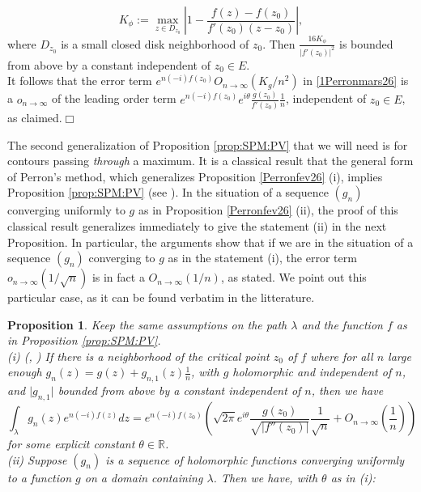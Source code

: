 \documentclass[11pt]{amsart}
\newtheorem{prop}[teo]{Proposition}
\newcommand{\mr}{\mathbb{R}}
\begin{document}
{$$K_\phi := \max_{z\in D_{z_0}} \left \vert 1-\frac{f(z)-f(z_0)}{f'(z_0)(z-z_0)}\right\vert,$$
where $D_{z_0}$ is a small closed disk neighborhood of $z_0$.  Then $\textstyle \frac{16K_\phi}{\vert f'(z_0)\vert^2}$ is bounded from above by a constant independent of $z_0\in E$.\\
It follows that the error term $\textstyle e^{n (-i) f(z_0)} O_{n \to \infty}\left(K_g/n^2\right)$ in \eqref{1Perronmars26} is a $\textstyle o_{n \to \infty}$ of the leading order term $\textstyle e^{n (-i) f(z_0)} e^{i \theta} \frac{g(z_0)}{f'(z_0)}\frac{1}{n}$, independent of $z_0\in E$, as claimed.\hfill $\Box$
\medskip

The second generalization of Proposition \ref{prop:SPM:PV} that we will need is for contours passing {\it through} a maximum. It is a classical result that the general form of Perron's method, which generalizes Proposition \ref{Perronfev26} (i), implies Proposition \ref{prop:SPM:PV} (see \cite[Corollary 1.4, case of $\mu=2$ and $k_2=k_1+1$]{O'Sul}). In the situation of a sequence $(g_n)$ converging uniformly to $g$ as in Proposition \ref{Perronfev26} (ii), the proof of this classical result generalizes immediately to give the statement (ii) in the next Proposition. In particular, the arguments show that if we are in the situation of a sequence $(g_n)$ converging to $g$ as in the statement (i), the error term $\textstyle o_{n \to \infty}\left(1/\sqrt{n}\right)$ is in fact a $O_{n \to \infty}\left(1/n\right)$, as stated. We point out this particular case, as it can be found verbatim in the litterature.
\begin{prop}\label{gensaddlen} Keep the same assumptions on the path $\lambda$ and the function $f$ as in Proposition \ref{prop:SPM:PV}.\\
(i) {\rm (\cite[Remark 3.3]{Oh}, \cite[page 145, note of $\S$5]{W})} If there is a neighborhood of the critical point $z_0$ of $f$ where for all $n$ large enough $\textstyle g_n(z) = g(z)+ g_{n,1}(z)\frac{1}{n}$, with $g$ holomorphic and independent of $n$, and $\vert g_{n,1} \vert$ bounded from above by a constant independent of $n$, then we have
$$ \int_{\lambda} g_n(z) e^{n (-i) f(z)} dz = 
e^{n (-i) f(z_0)} \left ( \sqrt{2\pi} e^{i \theta} \dfrac{g(z_0)}{\sqrt{|f''(z_0)|}}\dfrac{1}{\sqrt{n}} + O_{n \to \infty}\left(\frac{1}{n}\right) \right )
$$
for some explicit constant $\theta\in \mr$.\\
(ii) Suppose $(g_n)$ is a sequence of holomorphic functions converging uniformly to a function $g$ on a domain containing $\lambda$. Then we have, with $\theta$ as in (i):

\end{prop}}
\end{document}

